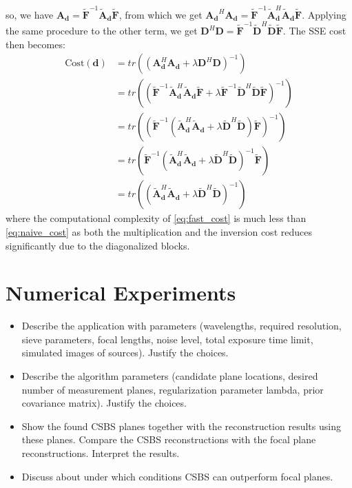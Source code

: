 \documentclass{article}
\begin{document}

so, we have $\bm{A_d} = \widetilde{\bm F}^{-1} \widetilde{\bm A}_{\bm d}
\widetilde{\bm F}$, from which we get $\bm{A_d}^H \bm{A_d} = \widetilde{\bm
F}^{-1} \widetilde{\bm A}_{\bm d}^H \widetilde{\bm A}_{\bm d} \widetilde{\bm
F}$. Applying the same procedure to the other term, we get $\bm D^H \bm D =
\widetilde{\bm F}^{-1} \widetilde{\bm D}^H \widetilde{\bm D} \widetilde{\bm F}$.
The SSE cost then becomes:
\begin{align}
\text{Cost}(\bm{d}) & = tr\left(\left(
{\bm A}_{\bm d}^H {\bm A}_{\bm d} + \lambda {\bm D}^H
{\bm D} \right)^{-1} \right)
\label{eq:naive_cost}\\
& = tr\left(\left(\widetilde{\bm F}^{-1} \widetilde{\bm
A}_{\bm d}^H \widetilde{\bm A}_{\bm d} \widetilde{\bm F} + \lambda \widetilde{\bm
F}^{-1} \widetilde{\bm D}^H \widetilde{\bm D} \widetilde{\bm
F}\right)^{-1}\right) \nonumber \\
& = tr\left(\left(\widetilde{\bm F}^{-1} \left(
\widetilde{\bm A}_{\bm d}^H \widetilde{\bm A}_{\bm d} + \lambda \widetilde{\bm D}^H
\widetilde{\bm D} \right) \widetilde{\bm F}\right)^{-1}\right) \nonumber \\
& = tr\left(\widetilde{\bm F}^{-1} \left(
\widetilde{\bm A}_{\bm d}^H \widetilde{\bm A}_{\bm d} + \lambda \widetilde{\bm D}^H
\widetilde{\bm D} \right)^{-1} \widetilde{\bm F}\right) \nonumber \\
& = tr\left(\left(
\widetilde{\bm A}_{\bm d}^H \widetilde{\bm A}_{\bm d} + \lambda \widetilde{\bm D}^H
\widetilde{\bm D} \right)^{-1} \right)
\label{eq:fast_cost}
\end{align}
where the computational complexity of \eqref{eq:fast_cost} is much less than
\eqref{eq:naive_cost} as both the multiplication and the inversion cost reduces
significantly due to the diagonalized blocks.

\section{Numerical Experiments}
\begin{itemize}
\item Describe the application with parameters (wavelengths, required resolution, sieve parameters, focal lengths, noise level, total exposure time limit, simulated images of sources). Justify the choices.

\item Describe the algorithm parameters (candidate plane locations, desired number of measurement planes, regularization parameter lambda, prior covariance matrix). Justify the choices.

\item Show the found CSBS planes together with the reconstruction results using these planes. Compare the CSBS reconstructions with the focal plane reconstructions. Interpret the results.

\item Discuss about under which conditions CSBS can outperform focal planes.
\end{itemize}
\end{document}
